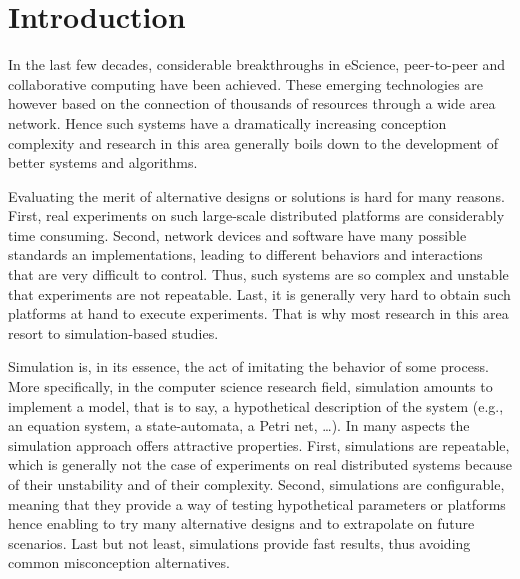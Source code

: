 \documentclass{sig-alternate}
\def\eg{e.g.,\xspace}
\begin{document}



\section{Introduction}

In the last few decades, considerable breakthroughs in eScience,
peer-to-peer and collaborative computing have been achieved.  These
emerging technologies are however based on the connection of thousands
of resources through a wide area network. Hence such systems have a
dramatically increasing conception complexity and research in this area
generally boils down to the development of better systems and algorithms.

Evaluating the merit of alternative designs or solutions is hard for
many reasons. First, real experiments on such large-scale distributed
platforms are considerably time consuming. Second, network devices and
software have many possible standards an implementations, leading to
different behaviors and interactions that are very difficult to
control. Thus, such systems are so complex and unstable that
experiments are not repeatable. Last, it is generally very hard to
obtain such platforms at hand to execute experiments. That is why most
research in this area resort to simulation-based studies.

Simulation is, in its essence, the act of imitating the behavior of some
process. More specifically, in the computer science research field,
simulation amounts to implement a model, that is to say, 
a hypothetical description of the system (\eg an equation system, a
state-automata, a Petri net, \dots). %
In many aspects the simulation approach offers attractive
properties. First, simulations are repeatable, which is generally not
the case of experiments on real distributed systems because of their
unstability and of their complexity. Second, simulations are
configurable, meaning that they provide a way of testing hypothetical
parameters or platforms hence enabling to try many alternative designs
and to extrapolate on future scenarios. Last but not least, simulations
provide fast results, thus avoiding common misconception
alternatives.
\end{document}
